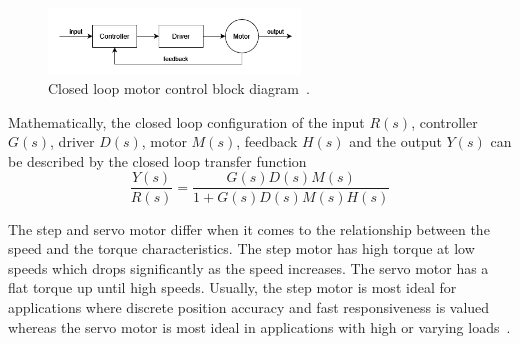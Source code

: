 \begin{figure}[H]
    \centering
    \includegraphics[width=0.6\textwidth]{figures/closed-loop.png}
    \caption{Closed loop motor control block diagram~\cite{loop}.} \label{fig:closed_loop}
\end{figure}

Mathematically, the closed loop configuration of the input $R(s)$, controller $G(s)$, driver $D(s)$, motor $M(s)$, feedback $H(s)$ and the output $Y(s)$ can be described by the closed loop transfer function
\begin{equation}
    \frac{Y(s)}{R(s)} = \frac{G(s)D(s)M(s)}{1+G(s)D(s)M(s)H(s)}
\end{equation}

The step and servo motor differ when it comes to the relationship between the speed and the torque characteristics. The step motor has high torque at low speeds which drops significantly as the speed increases. The servo motor has a flat torque up until high speeds. Usually, the step motor is most ideal for applications where discrete position accuracy and fast responsiveness is valued whereas the servo motor is most ideal in applications with high or varying loads~\cite{servo_step}.